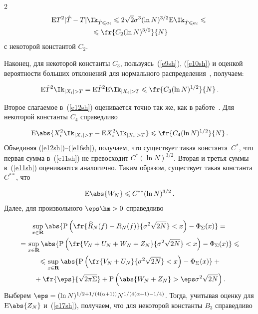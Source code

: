 \begin{multicols}{2}
\noindent
\begin{multline}
\mbox{E}T^2|\hat{T}-T|\Ik_{\hat{T}\leqslant 
a_i}\leqslant2\sqrt{2}\sigma^3(\ln N)^{{3}/{2}}\mbox{E}\Ik_{\hat{T}\leqslant 
a_i}\leqslant{}\\
{}\leqslant\fr{C_2(\ln N)^{{3}/{2}}}{N}\label{e14sh}
\end{multline}
с некоторой константой $C_2$.

Наконец, для некоторой константы $C_3$, пользуясь~(\ref{e9sh}), (\ref{e10sh}) 
и оценкой вероятности больших отклонений для нормального распределения~\cite{18sh}, получаем:

\noindent
\begin{equation}
\mbox{E}\hat{T}^2\Ik_{|X_i|> T}=\mbox{E}\hat{T}^2\mbox{E}\Ik_{|X_i|> T}\leqslant
\fr{C_3(\ln N)^{{1}/{2}}}{N}\,.\label{e15sh}
\end{equation}

Второе слагаемое в~(\ref{e12sh}) оценивается точно так же, как в работе~\cite{8sh}. 
Для некоторой константы $C_4$ справедливо

\noindent
\begin{equation}
\mbox{E}\abs{X_i^2\Ik_{|X_i|> T}-\mbox{E}X_i^2\Ik_{|X_i|> T}}\leqslant
\fr{C_4(\ln N)^{{1}/{2}}}{N}\,.\label{e16sh}
\end{equation}
Объединяя (\ref{e12sh})--(\ref{e16sh}), получаем, что существует такая константа~$C^*$, 
что первая сумма в~(\ref{e11sh}) не превосходит $C^*(\ln N)^{{3}/{2}}$. Вторая и 
третья суммы в~(\ref{e11sh}) оцениваются аналогично. Таким образом, существует такая 
константа $C^{**}$, что

\noindent
\begin{equation}
\mbox{E}\abs{W_N}\leqslant C^{**}(\ln N)^{{3}/{2}}\,.\label{e17sh}
\end{equation}
Далее, для произвольного $\eps\hm>0$ справедливо

\noindent
\begin{multline*}
\sup\limits_{x\in\mathbf{R}}\abs{\mbox{P}\left(\fr{\widehat{R}_N(f)-R_N(f)}{\sigma^2\sqrt{2N}}<x\right)-
\Phi_\Sigma(x)}={}\\
{}=\sup\limits_{x\in\mathbf{R}}\abs{\mbox{P}
\left(\fr{V_N+U_N+W_N+Z_N}{\sigma^2\sqrt{2N}}<x\right)-\Phi_\Sigma(x)}\leqslant{}\hspace*{-0.7pt}\\
{}\leqslant\sup\limits_{x\in\mathbf{R}}\abs{\mbox{P}\left(
\fr{V_N+U_N}{\sigma^2\sqrt{2N}}<x\right)- \Phi_\Sigma(x)}+{}\\
{}+\fr{\eps}{\sqrt{2\pi\Sigma}}+
\mbox{P}\left(\abs{W_N+Z_N}>\eps\sigma^2\sqrt{2N}\right).
\end{multline*}
Выберем $\eps=(\ln N)^{{1}/{2}+{1}/(4(\alpha+1))}N^{{1}/(4(\alpha+1)-{1}/{4})}$. 
Тогда, учитывая оценку для $\mbox{E}\abs{Z_N}$ и~(\ref{e17sh}), 
получаем, что для некоторой константы $B_3$ справедливо


\end{multicols}
